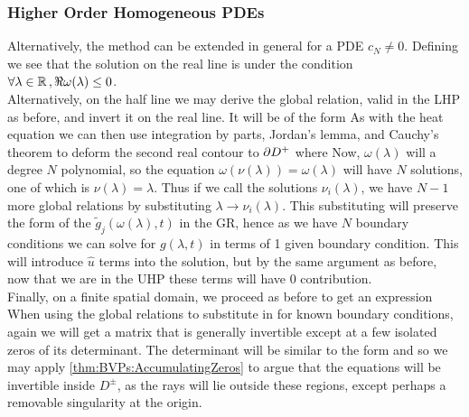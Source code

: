 \documentclass{article}
\begin{document}
\subsubsection{Higher Order Homogeneous PDEs}
Alternatively, the method can be extended in general for a PDE
$c_N \neq 0$. Defining 
we see that the solution on the real line is 
under the condition $\forall \lambda \in \mathbb{R} \,, \Re \omega(\lambda) \leq 0 $. \\
Alternatively, on the half line we may derive the global relation,
valid in the LHP as before, and invert it on the real line. It will be of the form 
As with the heat equation we can then use integration by parts, Jordan's lemma, and Cauchy's theorem to deform the second real contour to $\partial D^+$ where
Now, $\omega(\lambda)$ will a degree $N$ polynomial, so the equation $\omega(\nu(\lambda)) = \omega(\lambda)$ will have $N$ solutions, one of which is $\nu(\lambda) = \lambda$. Thus if we call the solutions $\nu_i(\lambda)$, we have $N-1$ more global relations by substituting $\lambda \to \nu_i(\lambda)$. This substituting will preserve the form of the $\tilde{g}_j(\omega(\lambda),t)$ in the GR, hence as we have $N$ boundary conditions we can solve for $g(\lambda,t)$ in terms of 1 given boundary condition. This will introduce $\hat{u}$ terms into the solution, but by the same argument as before, now that we are in the UHP these terms will have 0 contribution. \\
Finally, on a finite spatial domain, we proceed as before to get an expression 
When using the global relations to substitute in for known boundary conditions, again we will get a matrix that is generally invertible except at a few isolated zeros of its determinant. The determinant will be similar to the form 
and so we may apply \ref{thm:BVPs:AccumulatingZeros} to argue that the equations will be invertible inside $D^\pm$, as the rays will lie outside these regions, except perhaps a removable singularity at the origin. 
\end{document}

